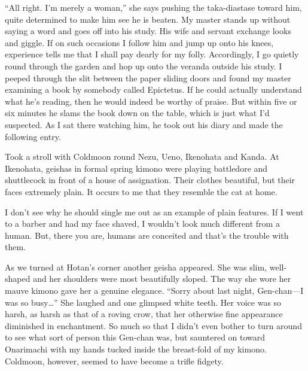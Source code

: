 \documentclass[12pt, openright]{book}
\begin{document}
``All right. I'm merely a woman,'' she says pushing the taka-diastase
toward him, quite determined to make him see he is beaten. My master
stands up without saying a word and goes off into his study. His wife
and servant exchange looks and giggle. If on such occasions I follow him
and jump up onto his knees, experience tells me that I shall pay dearly
for my folly. Accordingly, I go quietly round through the garden and hop
up onto the veranda outside his study. I peeped through the slit between
the paper sliding doors and found my master examining a book by somebody
called Epictetus. If he could actually understand what he's reading,
then he would indeed be worthy of praise. But within five or six minutes
he slams the book down on the table, which is just what I'd suspected.
As I sat there watching him, he took out his diary and made the
following entry.

Took a stroll with Coldmoon round Nezu, Ueno, Ikenohata and Kanda. At
Ikenohata, geishas in formal spring kimono were playing battledore and
shuttlecock in front of a house of assignation. Their clothes beautiful,
but their faces extremely plain. It occurs to me that they resemble the
cat at home.

I don't see why he should single me out as an example of plain features.
If I went to a barber and had my face shaved, I wouldn't look much
different from a human. But, there you are, humans are conceited and
that's the trouble with them.

As we turned at Hotan's corner another geisha appeared. She was slim,
well-shaped and her shoulders were most beautifully sloped. The way she
wore her mauve kimono gave her a genuine elegance. ``Sorry about last
night, Gen-chan---I was so busy\ldots{}'' She laughed and one glimpsed
white teeth. Her voice was so harsh, as harsh as that of a roving crow,
that her otherwise fine appearance diminished in enchantment. So much so
that I didn't even bother to turn around to see what sort of person this
Gen-chan was, but sauntered on toward Onarimachi with my hands tucked
inside the breast-fold of my kimono. Coldmoon, however, seemed to have
become a trifle fidgety.
\end{document}
